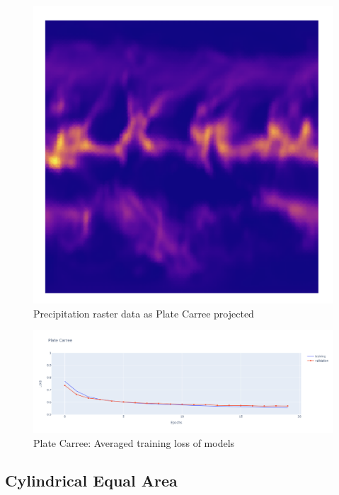\begin{figure}[H]
\begin{minipage}{0.30\textwidth}
        \includegraphics[width=0.9\linewidth]{figures/chapter-8/plate_caree_prect_raster.png}
        \caption{Precipitation raster data as Plate Carree projected}
        \label{fig:pc_prect_raster}
    \end{minipage}\hfill
\end{figure}

\begin{figure}[H]
    \centering
    \includegraphics[width=1.0\linewidth]{figures/chapter-8/plate_loss.png}
    \caption{Plate Carree: Averaged training loss of models  }
    \label{fig:pc_loss}
\end{figure}

\subsection{Cylindrical Equal Area}

